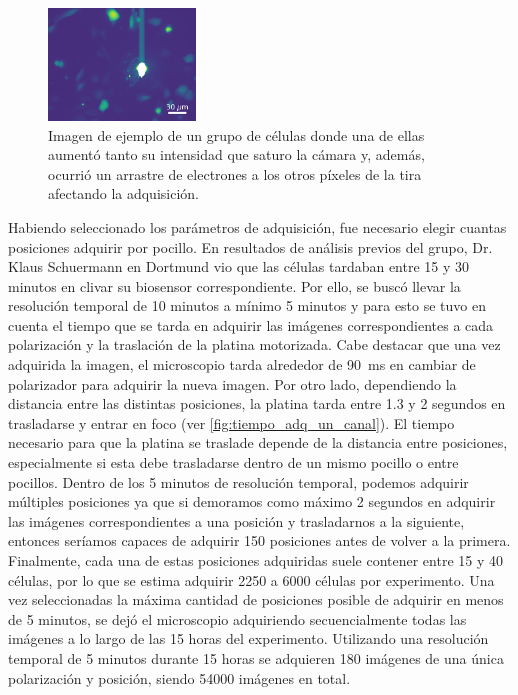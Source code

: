 \begin{figure}[htb]
    \centering
    \includegraphics[width=0.35\textwidth]{img/cap_2/saturation.png}
    \caption{\footnotesize{Imagen de ejemplo de un grupo de células donde una de ellas aumentó tanto su intensidad que saturo la cámara y, además, ocurrió un arrastre de electrones a los otros píxeles de la tira afectando la adquisición.}}
    \label{fig:saturacion}
\end{figure}

Habiendo seleccionado los parámetros de adquisición, fue necesario elegir cuantas posiciones adquirir por pocillo. En resultados de análisis previos del grupo, Dr. Klaus Schuermann en Dortmund vio que las células tardaban entre 15 y 30 minutos en clivar su biosensor correspondiente. Por ello, se buscó llevar la resolución temporal de 10 minutos a mínimo 5 minutos y para esto se tuvo en cuenta el tiempo que se tarda en adquirir las imágenes correspondientes a cada polarización y la traslación de la platina motorizada. Cabe destacar que una vez adquirida la imagen, el microscopio tarda alrededor de 90~ms en cambiar de polarizador para adquirir la nueva imagen. Por otro lado, dependiendo la distancia entre las distintas posiciones, la platina tarda entre 1.3 y 2 segundos en trasladarse y entrar en foco (ver \cref{fig:tiempo_adq_un_canal}). El tiempo necesario para que la platina se traslade depende de la distancia entre posiciones, especialmente si esta debe trasladarse dentro de un mismo pocillo o entre pocillos. Dentro de los 5 minutos de resolución temporal, podemos adquirir múltiples posiciones ya que si demoramos como máximo 2 segundos en adquirir las imágenes correspondientes a una posición y trasladarnos a la siguiente, entonces seríamos capaces de adquirir 150 posiciones antes de volver a la primera. Finalmente, cada una de estas posiciones adquiridas suele contener entre 15 y 40 células, por lo que se estima adquirir 2250 a 6000 células por experimento. Una vez seleccionadas la máxima cantidad de posiciones posible de adquirir en menos de 5 minutos, se dejó el microscopio adquiriendo secuencialmente todas las imágenes a lo largo de las 15 horas del experimento. Utilizando una resolución temporal de 5 minutos durante 15 horas se adquieren 180 imágenes de una única polarización y posición, siendo 54000 imágenes en total.

